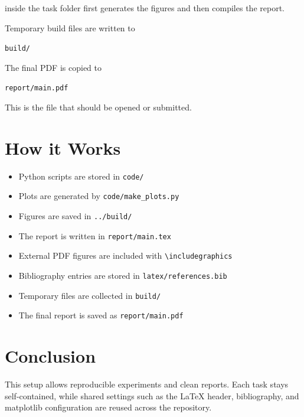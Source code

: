 inside the task folder first generates the figures and then compiles the report.

Temporary build files are written to

\begin{center}
  \texttt{build/}
\end{center}

The final PDF is copied to

\begin{center}
  \texttt{report/main.pdf}
\end{center}

This is the file that should be opened or submitted.

\section{How it Works}

\begin{itemize}
  \item Python scripts are stored in \texttt{code/}
  \item Plots are generated by \texttt{code/make\_plots.py}
  \item Figures are saved in \texttt{../build/}
  \item The report is written in \texttt{report/main.tex}
  \item External PDF figures are included with \texttt{\textbackslash includegraphics}
  \item Bibliography entries are stored in \texttt{latex/references.bib}
  \item Temporary files are collected in \texttt{build/}
  \item The final report is saved as \texttt{report/main.pdf}
\end{itemize}

\section{Conclusion}

This setup allows reproducible experiments and clean reports. Each task stays
self-contained, while shared settings such as the \LaTeX{} header, bibliography,
and matplotlib configuration are reused across the repository.

\printbibliography


